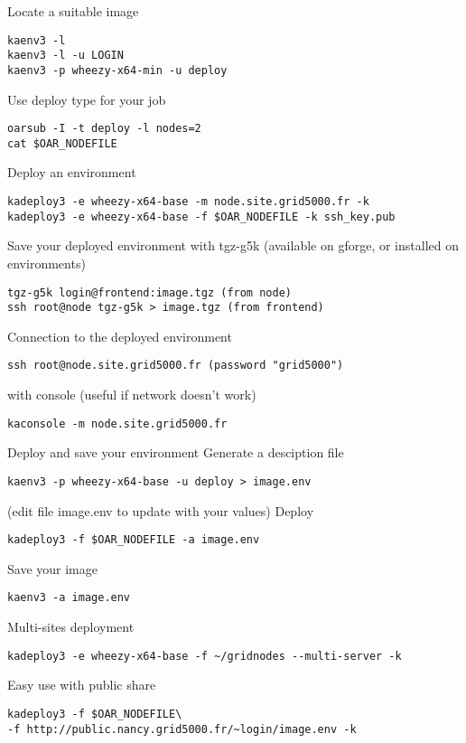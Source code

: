 Locate a suitable image
\begin{verbatim}
kaenv3 -l
kaenv3 -l -u LOGIN
kaenv3 -p wheezy-x64-min -u deploy
\end{verbatim}

Use deploy type for your job
\begin{verbatim}
oarsub -I -t deploy -l nodes=2
cat $OAR_NODEFILE
\end{verbatim}

Deploy an environment
\begin{verbatim}
kadeploy3 -e wheezy-x64-base -m node.site.grid5000.fr -k
kadeploy3 -e wheezy-x64-base -f $OAR_NODEFILE -k ssh_key.pub
\end{verbatim}

Save your deployed environment with tgz-g5k
(available on gforge, or installed on environments)
\begin{verbatim}
tgz-g5k login@frontend:image.tgz (from node)
ssh root@node tgz-g5k > image.tgz (from frontend)
\end{verbatim}

Connection to the deployed environment
\begin{verbatim}
ssh root@node.site.grid5000.fr (password "grid5000")
\end{verbatim}
with console (useful if network doesn't work)
\begin{verbatim}
kaconsole -m node.site.grid5000.fr
\end{verbatim}

Deploy and save your environment
Generate a desciption file
\begin{verbatim}
kaenv3 -p wheezy-x64-base -u deploy > image.env
\end{verbatim}
(edit file image.env to update with your values)
Deploy
\begin{verbatim}
kadeploy3 -f $OAR_NODEFILE -a image.env
\end{verbatim}
Save your image
\begin{verbatim}
kaenv3 -a image.env
\end{verbatim}

Multi-sites deployment
\begin{verbatim}
kadeploy3 -e wheezy-x64-base -f ~/gridnodes --multi-server -k
\end{verbatim}
Easy use with public share
\begin{verbatim}
kadeploy3 -f $OAR_NODEFILE\
-f http://public.nancy.grid5000.fr/~login/image.env -k
\end{verbatim}